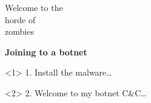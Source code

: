 {
\begin{frame}[plain]
    \Huge\bfseries
    \vspace{2cm}
    \color{white}
    \begin{minipage}{.7\textwidth}
      Welcome to the\\ horde of\\ zombies
    \end{minipage}
\end{frame}
}

\begin{frame}[plain]
  \begin{center}
    \LARGE\bfseries
    Joining to a botnet
  \end{center}

  \vspace{.5cm}

  \begin{onlyenv}<1>
    1. Install the malware\ldots
    \begin{center}
    \end{center}
  \end{onlyenv}

  \begin{onlyenv}<2>
    2. Welcome to my botnet C\&C\ldots
    \begin{center}
    \end{center}
  \end{onlyenv}

\end{frame}
